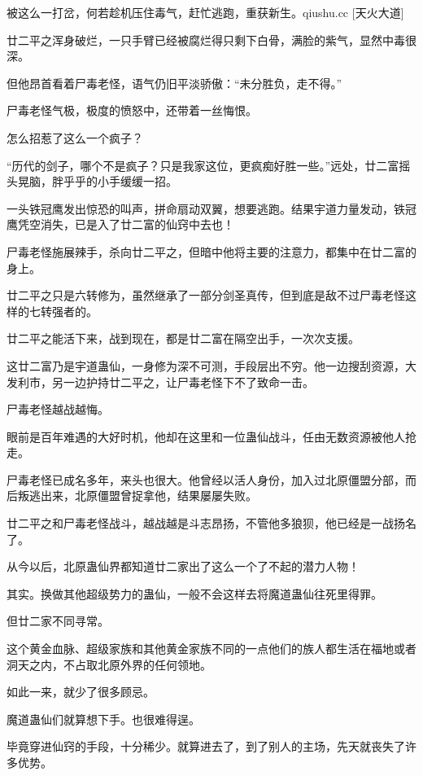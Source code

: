 
\begin{this_body}

被这么一打岔，何若趁机压住毒气，赶忙逃跑，重获新生。qiushu.cc [天火大道]

廿二平之浑身破烂，一只手臂已经被腐烂得只剩下白骨，满脸的紫气，显然中毒很深。

但他昂首看着尸毒老怪，语气仍旧平淡骄傲：“未分胜负，走不得。”

尸毒老怪气极，极度的愤怒中，还带着一丝悔恨。

怎么招惹了这么一个疯子？

“历代的剑子，哪个不是疯子？只是我家这位，更疯痴好胜一些。”远处，廿二富摇头晃脑，胖乎乎的小手缓缓一招。

一头铁冠鹰发出惊恐的叫声，拼命扇动双翼，想要逃跑。结果宇道力量发动，铁冠鹰凭空消失，已是入了廿二富的仙窍中去也！

尸毒老怪施展辣手，杀向廿二平之，但暗中他将主要的注意力，都集中在廿二富的身上。

廿二平之只是六转修为，虽然继承了一部分剑圣真传，但到底是敌不过尸毒老怪这样的七转强者的。

廿二平之能活下来，战到现在，都是廿二富在隔空出手，一次次支援。

这廿二富乃是宇道蛊仙，一身修为深不可测，手段层出不穷。他一边搜刮资源，大发利市，另一边护持廿二平之，让尸毒老怪下不了致命一击。

尸毒老怪越战越悔。

眼前是百年难遇的大好时机，他却在这里和一位蛊仙战斗，任由无数资源被他人抢走。

尸毒老怪已成名多年，来头也很大。他曾经以活人身份，加入过北原僵盟分部，而后叛逃出来，北原僵盟曾捉拿他，结果屡屡失败。

廿二平之和尸毒老怪战斗，越战越是斗志昂扬，不管他多狼狈，他已经是一战扬名了。

从今以后，北原蛊仙界都知道廿二家出了这么一个了不起的潜力人物！

其实。换做其他超级势力的蛊仙，一般不会这样去将魔道蛊仙往死里得罪。

但廿二家不同寻常。

这个黄金血脉、超级家族和其他黄金家族不同的一点他们的族人都生活在福地或者洞天之内，不占取北原外界的任何领地。

如此一来，就少了很多顾忌。

魔道蛊仙们就算想下手。也很难得逞。

毕竟穿进仙窍的手段，十分稀少。就算进去了，到了别人的主场，先天就丧失了许多优势。


\end{this_body}
